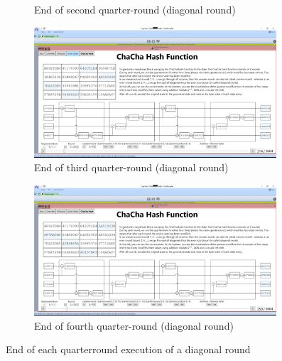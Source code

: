 \begin{figure}
\begin{subfigure}{0.5\textwidth}
  \caption{End of second quarter-round (diagonal round)}
  \label{fig:chachahash.dr.2}
\end{subfigure}
\begin{subfigure}{0.5\textwidth}
  \centering
  \includegraphics[width=0.99\textwidth]{figures/ct2/chachahash/chachahash-dr3-end.png}
  \caption{End of third quarter-round (diagonal round)}
  \label{fig:chachahash.dr.3}
\end{subfigure}%
\begin{subfigure}{0.5\textwidth}
  \centering
  \includegraphics[width=0.99\textwidth]{figures/ct2/chachahash/chachahash-dr4-end.png}
  \caption{End of fourth quarter-round (diagonal round)}
  \label{fig:chachahash.dr.4}
\end{subfigure}
\caption[End of diagonal rounds]{End of each quarterround execution of a diagonal round}
\label{fig:chachahash.dr}
\end{figure}

